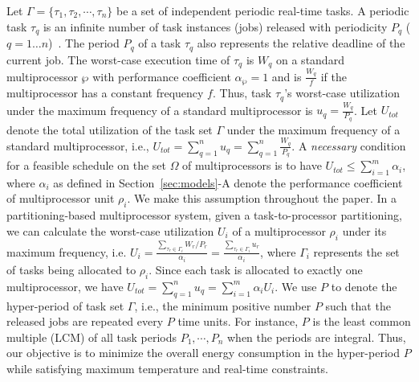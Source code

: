 \documentclass[conference]{IEEEtran}
\begin{document}
Let  $\Gamma = \{\tau_1, \tau_2, \cdots, \tau_n\}$ be  a set of independent periodic real-time tasks.
A periodic task $\tau_q$ is an infinite number of task instances (jobs) released with periodicity $P_q$ ($q=1\ldots n$)~\cite{Liu00}.
The period $P_q$ of a task $\tau_q$
also represents the relative deadline of the current job.
The worst-case execution time of $\tau_q$ is $W_q$ on a standard multiprocessor $\wp$ with performance coefficient $\alpha_{\wp}=1$ and is
$\frac{W_q}{f}$ if the multiprocessor has a constant frequency $f$.
Thus, task $\tau_q$'s worst-case utilization under the maximum frequency of a standard multiprocessor is
$u_q = \frac{W_q}{P_q}$.
Let $U_{tot}$ denote the total
utilization of the task set $\Gamma$ under the maximum frequency of a standard multiprocessor, i.e., $U_{tot} = \sum_{q=1}^{n} u_q = \sum_{q=1}^{n} \frac{W_q}{P_q}$.
A \emph{necessary} condition for a feasible schedule on the set $\Omega$ of multiprocessors is to have
$U_{tot} \leq  \sum_{i=1}^{m} \alpha_i $, where $\alpha_i$ as defined in Section~\ref{sec:models}-A denote the performance coefficient of multiprocessor unit $\rho_i$.
We make this assumption throughout the paper.
In a partitioning-based multiprocessor system, given a task-to-processor partitioning, we can calculate the worst-case utilization $U_{i}$ of a multiprocessor $\rho_{i}$ under its maximum frequency, i.e. $U_{i}=\frac{\sum_{\tau_r \in  \Gamma_{i}} W_r/P_r}{\alpha_i}=\frac{\sum_{\tau_r \in  \Gamma_{i}} u_r}{\alpha_i}$, where $\Gamma_{i}$ represents the set of tasks being allocated to $\rho_{i}$. Since each task is allocated to exactly one multiprocessor, we have $U_{tot} = \sum_{q=1}^{n} u_q = \sum_{i=1}^{m} \alpha_i U_{i}$.
We use $P$ to denote the hyper-period of task set $\Gamma$, i.e., the minimum positive number $P$ such that the released jobs are repeated every $P$ time units. For instance, $P$ is the least common multiple (LCM) of all task periods $P_1, \cdots, P_n$ when the periods are integral.
Thus, our objective is to minimize the overall energy consumption in the hyper-period $P$ while satisfying maximum temperature and real-time constraints.
\end{document}
